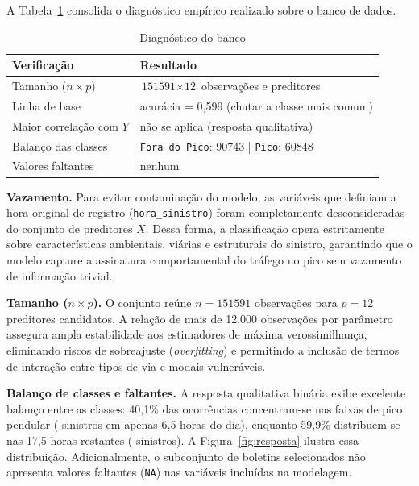 \documentclass[
  article,
  12pt,
  oneside,
  a4paper,
  english,
  brazil
]{abntex2}\usepackage[]{graphicx}\usepackage[]{xcolor}
\begin{document}
A Tabela~\ref{tab:diag} consolida o diagnóstico empírico realizado sobre o banco de dados.

\begin{table}[htb]
  \centering
  \caption{Diagnóstico do banco}
  \label{tab:diag}
  \footnotesize
  \begin{tabular}{@{}p{}p{}@{}}
    \toprule
    \textbf{Verificação} & \textbf{Resultado} \\
    \midrule
    Tamanho ($n \times p$)   & $\text{151591} \times \text{12}$ observações e preditores \\
    Linha de base            & acur\'acia = 0,599 \quad (chutar a classe mais comum) \\
    Maior correlação com $Y$ & n\~ao se aplica (resposta qualitativa) \\
    Balanço das classes      & \texttt{Fora do Pico}: 90743 | \texttt{Pico}: 60848 \\
    Valores faltantes        & nenhum \\
    \bottomrule
  \end{tabular}
\end{table}

\textbf{Vazamento.} Para evitar contaminação do modelo, as variáveis que definiam a hora original de registro (\texttt{hora\_sinistro}) foram completamente desconsideradas do conjunto de preditores $X$. Dessa forma, a classificação opera estritamente sobre características ambientais, viárias e estruturais do sinistro, garantindo que o modelo capture a assinatura comportamental do tráfego no pico sem vazamento de informação trivial.

\textbf{Tamanho ($n \times p$).} O conjunto reúne $n = \text{151591}$ observações para $p = \text{12}$ preditores candidatos. A relação de mais de 12.000 observações por parâmetro assegura ampla estabilidade aos estimadores de máxima verossimilhança, eliminando riscos de sobreajuste (\textit{overfitting}) e permitindo a inclusão de termos de interação entre tipos de via e modais vulneráveis.

\textbf{Balanço de classes e faltantes.} A resposta qualitativa binária exibe excelente balanço entre as classes: 40,1\% das ocorrências concentram-se nas faixas de pico pendular ( sinistros em apenas 6,5 horas do dia), enquanto 59,9\% distribuem-se nas 17,5 horas restantes ( sinistros). A Figura~\ref{fig:resposta} ilustra essa distribuição. Adicionalmente, o subconjunto de boletins selecionados não apresenta valores faltantes (\texttt{NA}) nas variáveis incluídas na modelagem.
\end{document}
